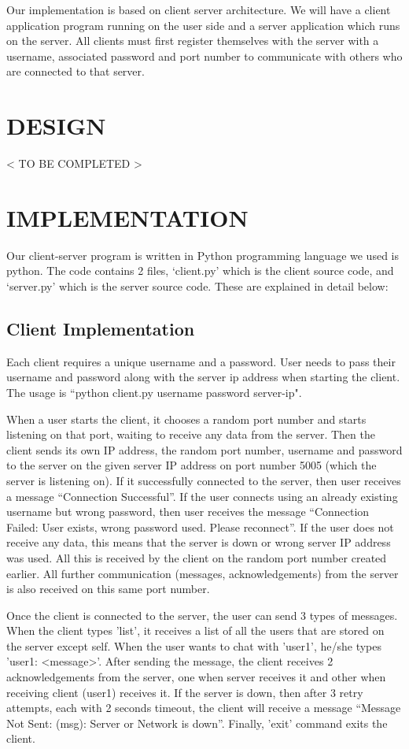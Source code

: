 \documentclass[10pt, pdftex, twocolumn]{report}
\begin{document}
	Our implementation is based on client server architecture. We will have a client application program running on the user side and a server application which runs on the server. All clients must first register themselves with the server with a username, associated password and port number to communicate with others who are connected to that server.
	
	
	\section*{DESIGN}
	< TO BE COMPLETED >
	
	
	\section*{IMPLEMENTATION}
	Our client-server program is written in Python programming language we used is python. The code contains 2 files, ‘client.py’ which is the client source code, and ‘server.py’ which is the server source code. These are explained in detail below:
	
	\subsection*{Client Implementation}
	Each client requires a unique username and a password. User needs to pass their username and password along with the server ip address when starting the client. 
	The usage is “python client.py username password server-ip". 
	
	When a user starts the client, it chooses a random port number and starts listening on that port, waiting to receive any data from the server. Then the client sends its own IP address, the random port number, username and password to the server on the given server IP address on port number 5005 (which the server is listening on). If it successfully connected to the server, then user receives a message “Connection Successful”. If the user connects using an already existing username but wrong password, then user receives the message “Connection Failed: User exists, wrong password used. Please reconnect”. If the user does not receive any data, this means that the server is down or wrong server IP address was used. All this is received by the client on the random port number created earlier. All further communication (messages, acknowledgements) from the server is also received on this same port number.
	
	Once the client is connected to the server, the user can send 3 types of messages. When the client types 'list', it receives a list of all the users that are stored on the server except self. When the user wants to chat with 'user1', he/she types 'user1: <message>'. After sending the message, the client receives 2 acknowledgements from the server, one when server receives it and other when receiving client (user1) receives it. If the server is down, then after 3 retry attempts, each with 2 seconds timeout, the client will receive a message “Message Not Sent: (msg): Server or Network is down”. Finally, 'exit' command exits the client.
	
\end{document}
